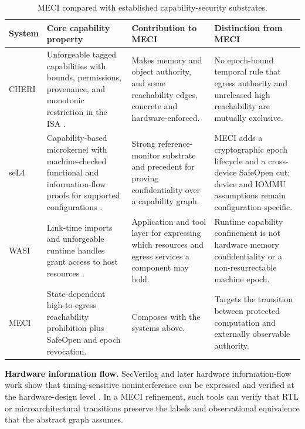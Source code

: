 \documentclass[11pt,letterpaper]{article}
\theoremstyle{plain}
\theoremstyle{definition}
\begin{document}
\begin{table}[t]
\centering\small
\caption{MECI compared with established capability-security substrates.}\label{tab:cap}
\begin{tabularx}{\textwidth}{@{}p{1.3cm}YYY@{}}
\toprule
System & Core capability property & Contribution to MECI & Distinction from MECI\\
\midrule
CHERI & Unforgeable tagged capabilities with bounds, permissions, provenance, and monotonic restriction in the ISA \cite{cheri}. & Makes memory and object authority, and some reachability edges, concrete and hardware-enforced. & No epoch-bound temporal rule that egress authority and unreleased high reachability are mutually exclusive.\\
seL4 & Capability-based microkernel with machine-checked functional and information-flow proofs for supported configurations \cite{murray2013,sel4docs}. & Strong reference-monitor substrate and precedent for proving confidentiality over a capability graph. & MECI adds a cryptographic epoch lifecycle and a cross-device SafeOpen cut; device and IOMMU assumptions remain configuration-specific.\\
WASI & Link-time imports and unforgeable runtime handles grant access to host resources \cite{wasi}. & Application and tool layer for expressing which resources and egress services a component may hold. & Runtime capability confinement is not hardware memory confidentiality or a non-resurrectable machine epoch.\\
MECI & State-dependent high-to-egress reachability prohibition plus SafeOpen and epoch revocation. & Composes with the systems above. & Targets the transition between protected computation and externally observable authority.\\
\bottomrule
\end{tabularx}
\end{table}

\textbf{Hardware information flow.} SecVerilog and later hardware information-flow work show that timing-sensitive noninterference can be expressed and verified at the hardware-design level \cite{secverilog,cheang2023}. In a MECI refinement, such tools can verify that RTL or microarchitectural transitions preserve the labels and observational equivalence that the abstract graph assumes.
\end{document}

